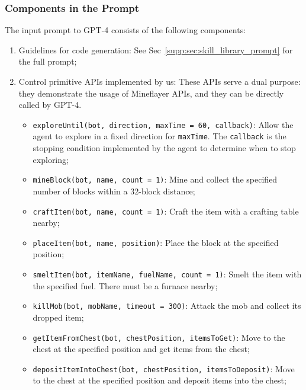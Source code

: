 \subsubsection{Components in the Prompt}
\label{supp:sec:skill_library_components}
The input prompt to GPT-4 consists of the following components: 
\begin{enumerate}[label=(\arabic*)]
    \item Guidelines for code generation: See Sec~\ref{supp:sec:skill_library_prompt} for the full prompt;
    \item Control primitive APIs implemented by us: These APIs serve a dual purpose: they demonstrate the usage of Mineflayer APIs, and they can be directly called by GPT-4.
    \begin{itemize}
        \item \texttt{exploreUntil(bot, direction, maxTime = 60, callback)}: Allow the agent to explore in a fixed direction for \texttt{maxTime}. The \texttt{callback} is the stopping condition implemented by the agent to determine when to stop exploring;
        \item \texttt{mineBlock(bot, name, count = 1)}: Mine and collect the specified number of blocks within a 32-block distance;
        \item \texttt{craftItem(bot, name, count = 1)}: Craft the item with a crafting table nearby;
        \item \texttt{placeItem(bot, name, position)}: Place the block at the specified position;
        \item \texttt{smeltItem(bot, itemName, fuelName, count = 1)}: Smelt the item with the specified fuel. There must be a furnace nearby;
        \item \texttt{killMob(bot, mobName, timeout = 300)}: Attack the mob and collect its dropped item;
        \item \texttt{getItemFromChest(bot, chestPosition, itemsToGet)}: Move to the chest at the specified position and get items from the chest;
        \item \texttt{depositItemIntoChest(bot, chestPosition, itemsToDeposit)}: Move to the chest at the specified position and deposit items into the chest;
        

\end{itemize}
\end{enumerate}
